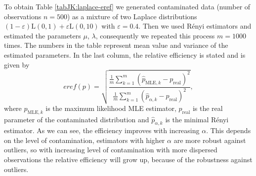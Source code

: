{\noindent To obtain Table \ref{tabJK:laplace-eref} we generated contaminated data (number of observations $n = 500$) as a mixture of two Laplace distributions $(1-\varepsilon)\mathrm{L}(0,1) + \varepsilon \mathrm{L}(0,10)$ with $\varepsilon =  0.4$.
Then we used R\'{e}nyi estimators and estimated the parameters $\mu$, $\lambda$, consequently we repeated this process $m = 1000$ times. The numbers in the table represent mean value and variance of the estimated parameters. In the last column, the relative efficiency is stated and is given by
\begin{equation}
eref(p) = \sqrt{\dfrac{\frac{1}{m}\sum_{k=1}^m (\hat{p}_{\mathrm{MLE} ,k} - p_{\mathrm{real}})^2}{\frac{1}{m}\sum_{k=1}^m (\hat{p}_{\alpha,k} - p_{\mathrm{real}})^2}},
\end{equation}
where $ \hat{p}_{\mathrm{MLE},k}$ is the maximum likelihood MLE estimator, $p_{\mathrm{real}}$ is the real parameter of the contaminated distribution and $\hat{p}_{\alpha,k}$ is the minimal R\'{e}nyi estimator. As we can see, the efficiency improves with increasing $\alpha$. This depends on the level of contamination, estimators with higher $\alpha$ are more robust against outliers, so with increasing level of contamination with more dispersed observations the relative efficiency will grow up, because of the robustness against outliers.

}
